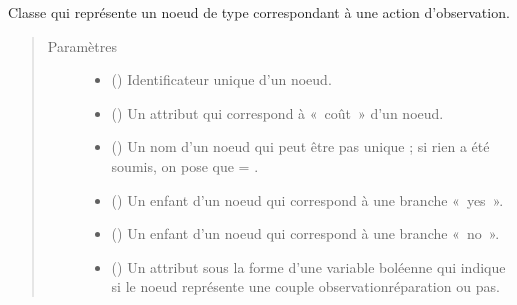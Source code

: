 \documentclass[letterpaper,10pt,french]{sphinxmanual}
\begin{document}
\begin{fulllineitems}
\label{\detokenize{index:StrategyTree.Observation}}
Classe qui représente un noeud de type correspondant à une action d’observation.
\begin{quote}\begin{description}
\item[{Paramètres}] \leavevmode\begin{itemize}
\item {} 
 () \textendash{} Identificateur unique d’un noeud.

\item {} 
 () \textendash{} Un attribut qui correspond à « coût » d’un noeud.

\item {} 
 (\sphinxstyleliteralemphasis{\sphinxupquote{, }}) \textendash{} Un nom d’un noeud qui peut être pas unique ; si rien a été soumis, on pose que  = .

\item {} 
 ({\hyperref[\detokenize{index:StrategyTree.NodeST}]{}}\sphinxstyleliteralemphasis{\sphinxupquote{, }}) \textendash{} Un enfant d’un noeud qui correspond à une branche « yes ».

\item {} 
 ({\hyperref[\detokenize{index:StrategyTree.NodeST}]{}}\sphinxstyleliteralemphasis{\sphinxupquote{, }}) \textendash{} Un enfant d’un noeud qui correspond à une branche « no ».

\item {} 
 (\sphinxstyleliteralemphasis{\sphinxupquote{, }}) \textendash{} Un attribut sous la forme d’une variable boléenne qui indique si le noeud représente une couple
observation\sphinxhyphen{}réparation ou pas.


\end{itemize}
\end{description}
\end{quote}
\end{fulllineitems}
\end{document}
